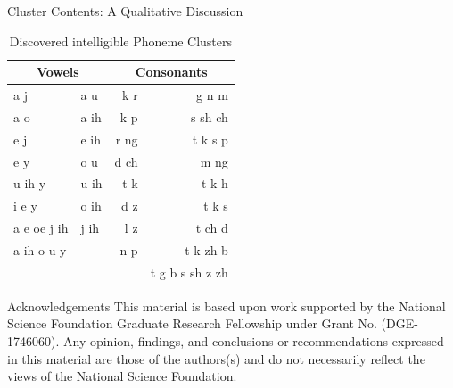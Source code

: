 \documentclass[final]{beamer} %
\begin{document}
\begin{frame}
\begin{columns}
\begin{column}{0.22\textwidth}
{\begin{block}{\boxnumber Cluster Contents: A Qualitative Discussion}
          \begin{table}[!htbp]
            \centering
            \caption{Discovered intelligible Phoneme Clusters}
            \label{tab:results}
            \begin{adjustbox}{width=.5\textwidth}
              \begin{tabular}{llrr}
                \toprule
                \multicolumn{2}{c}{Vowels} &  \multicolumn{2}{c}{ Consonants} \\
                \midrule
                a  j & a  u  &   k  r &     g n m \\
                a  o & a  ih  &    k p  &    s sh ch\\
                e  j & e  ih & r ng & t k s p \\
                e  y &o  u & d ch & m ng\\
                u  ih  y   & u  ih & t k & t k h\\
                i  e  y &o  ih & d z&t k s \\
                a  e  oe  j ih & j ih & l z  & t ch d\\
                a  ih  o  u  y &  &  n p & t k zh b  \\
                &&& t g b s sh z zh \\
                \bottomrule
              \end{tabular}
            \end{adjustbox}
          \end{table}
          
        \end{block}
        \vspace{.5cm}
        
        
        \begin{block}{\boxnumber Acknowledgements}
          \footnotesize{This material is based upon work supported by the National Science Foundation Graduate Research Fellowship under Grant No. (DGE-1746060). Any opinion, findings, and conclusions or recommendations expressed in this material are those of the authors(s) and do not necessarily reflect the views of the National Science Foundation.}
        \end{block}
        \vspace{.5cm}
        
      } %
    \end{column}


    
  \end{columns}
\end{frame}
\end{document}
